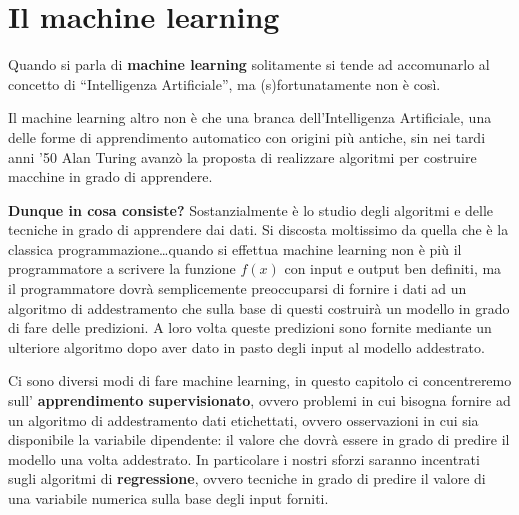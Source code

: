\documentclass[a4paper, 11pt, oneside]{report}
\begin{document}
    \chapter{Il machine learning}
        Quando si parla di \textbf{machine learning} solitamente si tende ad accomunarlo al concetto di ``Intelligenza Artificiale'',
        ma (s)fortunatamente non è così.
        \par \noindent Il machine learning altro non è che una branca dell'Intelligenza Artificiale, una delle forme
        di apprendimento automatico con origini più antiche, sin nei tardi anni '50 Alan Turing avanzò la proposta
        di realizzare algoritmi per costruire macchine in grado di apprendere.
        \par \noindent \textbf{Dunque in cosa consiste?} Sostanzialmente è lo studio degli algoritmi e delle tecniche in
        grado di apprendere dai dati.
        Si discosta moltissimo da quella che è la classica programmazione\ldots quando si effettua machine learning non
        è più il programmatore a scrivere la funzione $f(x)$ con input e output ben definiti, ma il
        programmatore dovrà semplicemente preoccuparsi di fornire i dati ad un algoritmo di addestramento che sulla base
        di questi costruirà un modello in grado di fare delle predizioni. A loro volta queste predizioni sono fornite
        mediante un ulteriore algoritmo dopo aver dato in pasto degli input al modello addestrato.
        \\
        \par \noindent Ci sono diversi modi di fare machine learning, in questo capitolo ci concentreremo sull'
        \textbf{apprendimento supervisionato}, ovvero problemi in cui bisogna fornire ad un algoritmo di addestramento
        dati etichettati, ovvero osservazioni in cui sia disponibile la variabile dipendente: il valore che
        dovrà essere in grado di predire il modello una volta addestrato.
        In particolare i nostri sforzi saranno incentrati sugli algoritmi di \textbf{regressione}, ovvero tecniche in grado
        di predire il valore di una variabile numerica sulla base degli input forniti.

            \bigskip
\end{document}
